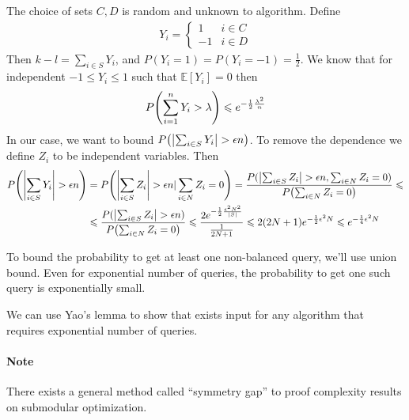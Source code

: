 \begin{theorem}
	The choice of sets $C,D$ is random and unknown to algorithm. Define 
	\begin{align}
	Y_i = \begin{cases}
	1 & i\in C\\
	-1 & i\in D
	\end{cases}
	\end{align}
	Then $k-l = \sum_{i \in S} Y_i$, and $P(Y_i=1)=P(Y_i=-1)=\frac{1}{2}$. We know that for independent $-1\leqslant Y_i\leqslant 1$ such that $\mathbb{E} [Y_i] = 0$ then
	\begin{align}
		P\qty(\sum_{i =1}^n Y_i > \lambda) \leqslant e^{-\frac{1}{2}\frac{\lambda^2}{n}}
	\end{align}
	In our case, we want to bound $P\qty(\abs{\sum_{i \in S} Y_i} > \epsilon n)$. To remove the dependence we define $Z_i$ to be independent variables. Then
	\begin{align}
	P\qty(\abs{\sum_{i \in S} Y_i} > \epsilon n) &= 	P\qty(\abs{\sum_{i \in S} Z_i} > \epsilon n | \sum_{i\in N} Z_i = 0)  = \frac{P(\abs{\sum_{i \in S} Z_i} > \epsilon n , \sum_{i\in N} Z_i = 0)}{P\qty(\sum_{i\in N} Z_i = 0)} \leqslant\\&\leqslant \frac{P(\abs{\sum_{i \in S} Z_i} > \epsilon n)}{P\qty(\sum_{i\in N} Z_i = 0)} \leqslant \frac{2e^{-\frac{1}{2} \frac{\epsilon^2 N^2}{\abs{S}}}}{\frac{1}{2N+1}} \leqslant 2(2N+1)e^{-\frac{1}{2} \epsilon^2 N} \leqslant e^{-\frac{1}{4} \epsilon^2 N}
	\end{align}
	
	To bound the probability to get at least one non-balanced query, we'll use union bound. Even for exponential number of queries, the probability to get one such query is exponentially small.
	
	We can use Yao's lemma to show that exists input for any algorithm that requires exponential number of queries.
\end{theorem}


\paragraph{Note} There exists a general method called ``symmetry gap'' \cite{vondrak2013symmetry} to proof complexity results on submodular optimization.